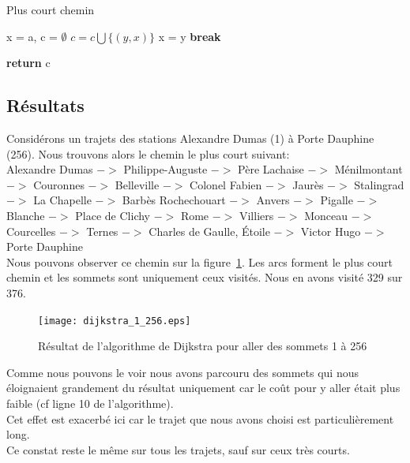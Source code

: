 \documentclass{article}
\begin{document}
\clearpage


\begin{algorithm}
\caption{Plus court chemin}\label{pcc}
\begin{algorithmic}[1]
	\State x = a, c = $\emptyset$
				\State $c = c \bigcup \{(y,x)\}$
				\State x = y
				\State \textbf{break}
			\EndIf
		\EndFor
	\EndWhile
	
	\State \textbf{return} c
\EndProcedure
\end{algorithmic}
\end{algorithm}

\subsection{Résultats}

Considérons un trajets des stations Alexandre Dumas (1) à Porte Dauphine (256).
Nous trouvons alors le chemin le plus court suivant:\\

Alexandre Dumas
$->$ Philippe-Auguste
$->$ Père Lachaise
$->$ Ménilmontant
$->$ Couronnes
$->$ Belleville
$->$ Colonel Fabien
$->$ Jaurès
$->$ Stalingrad
$->$ La Chapelle
$->$ Barbès Rochechouart
$->$ Anvers
$->$ Pigalle
$->$ Blanche
$->$ Place de Clichy
$->$ Rome
$->$ Villiers
$->$ Monceau
$->$ Courcelles
$->$ Ternes
$->$ Charles de Gaulle, Étoile
$->$ Victor Hugo
$->$ Porte Dauphine\\

Nous pouvons observer ce chemin sur la figure~\ref{dijkstra_1}. Les arcs forment le plus court
chemin et les sommets sont uniquement ceux visités. Nous en avons visité 329 sur 376.\\

\begin{figure}[!hbt]
	\centering
		\texttt{[image: dijkstra\_1\_256.eps]}
	\caption{Résultat de l'algorithme de Dijkstra pour aller des sommets 1 à 256}
	\label{dijkstra_1}
\end{figure}

Comme nous pouvons le voir nous avons parcouru des sommets qui nous éloignaient grandement du résultat
uniquement car le coût pour y aller était plus faible (cf ligne 10 de l'algorithme).\\
Cet effet est exacerbé ici car le trajet que nous avons choisi est particulièrement long.\\
Ce constat reste le même sur tous les trajets, sauf sur ceux très courts.\\
\end{document}
